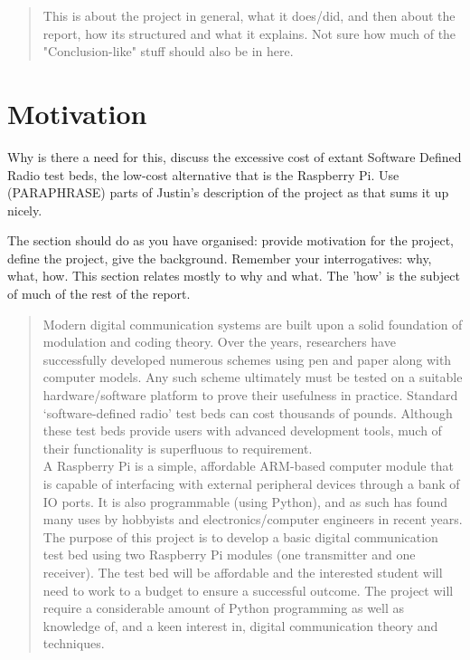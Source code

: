 \documentclass[../main.tex]{subfiles}
\begin{document}
\begin{quotation}
	This is about the project in general, what it does/did, and then about the report, how its structured and what it explains. Not sure how much of the "Conclusion-like" stuff should also be in here.
\end{quotation}




\section{Motivation}

Why is there a need for this, discuss the excessive cost of extant Software Defined Radio test beds, the low-cost alternative that is the Raspberry Pi. Use (PARAPHRASE) parts of Justin's description of the project as that sums it up nicely.

The section should do as you have organised: provide motivation for the project, define the project, give the background.  Remember your interrogatives: why, what, how.  This section relates mostly to why and what.  The 'how' is the subject of much of the rest of the report.

\begin{quotation}
	Modern digital communication systems are built upon a solid foundation of modulation and coding theory.
	Over the years, researchers have successfully developed numerous schemes using pen and paper along with computer models.
	Any such scheme ultimately must be tested on a suitable hardware/software platform to prove their usefulness in practice.
	Standard ‘software-defined radio’ test beds can cost thousands of pounds.
	Although these test beds provide users with advanced development tools, much of their functionality is superfluous to requirement.\\
	
	A Raspberry Pi is a simple, affordable ARM-based computer module that is capable of interfacing with external peripheral devices through a bank of IO ports.
	It is also programmable (using Python), and as such has found many uses by hobbyists and electronics/computer engineers in recent years.
	The purpose of this project is to develop a basic digital communication test bed using two Raspberry Pi modules (one transmitter and one receiver).
	The test bed will be affordable and the interested student will need to work to a budget to ensure a successful outcome.
	The project will require a considerable amount of Python programming as well as knowledge of, and a keen interest in, digital communication theory and techniques.
\end{quotation}
\end{document}
